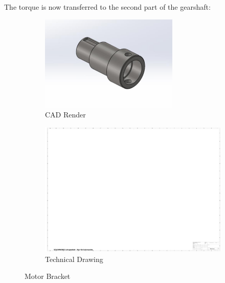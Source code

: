 The torque is now transferred to the second part of the gearshaft:
\begin{figure}[ht!]
  \centering
  \begin{subfigure}{.5\textwidth}
    \centering
    \includegraphics[width=\linewidth]{texfiles/mech/eimg/propulsion/picture_gearshaft_left}
    \caption{CAD Render}
    \label{fig:CAD Motorshaft}
  \end{subfigure}%
  \begin{subfigure}{.5\textwidth}
    \centering
    \includegraphics[width=\linewidth]{texfiles/mech/eimg/propulsion/spaceholder_technical_drawing}
    \caption{Technical Drawing}
    \label{fig:TD Motorshaft}
  \end{subfigure}
  \caption{Motor Bracket}
  \label{fig:Motorshaft}
  \end{figure}




